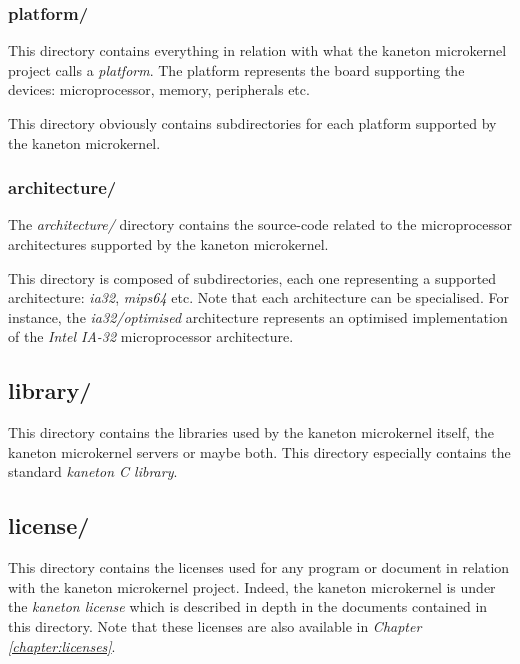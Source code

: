 
\subsubsection*{platform/}

This directory contains everything in relation with what the kaneton
microkernel project calls a \textit{platform}. The platform represents the
board supporting the devices: microprocessor, memory, peripherals etc.

This directory obviously contains subdirectories for each platform
supported by the kaneton microkernel.


\subsubsection*{architecture/}

The \textit{architecture/} directory contains the source-code related to
the microprocessor architectures supported by the kaneton microkernel.

This directory is composed of subdirectories, each one representing a
supported architecture: \textit{ia32}, \textit{mips64} etc. Note that each
architecture can be specialised. For instance, the \textit{ia32/optimised}
architecture represents an optimised implementation of the \textit{Intel IA-32}
microprocessor architecture.

%
%

\subsection*{library/}

This directory contains the libraries used by the kaneton microkernel itself,
the kaneton microkernel servers or maybe both. This directory especially
contains the standard \textit{kaneton C library}.

%
%

\subsection*{license/}

This directory contains the licenses used for any program or document
in relation with the kaneton microkernel project. Indeed, the kaneton
microkernel is under the \textit{kaneton license} which is described in
depth in the documents contained in this directory. Note that these licenses
are also available in \textit{Chapter \ref{chapter:licenses}}.

